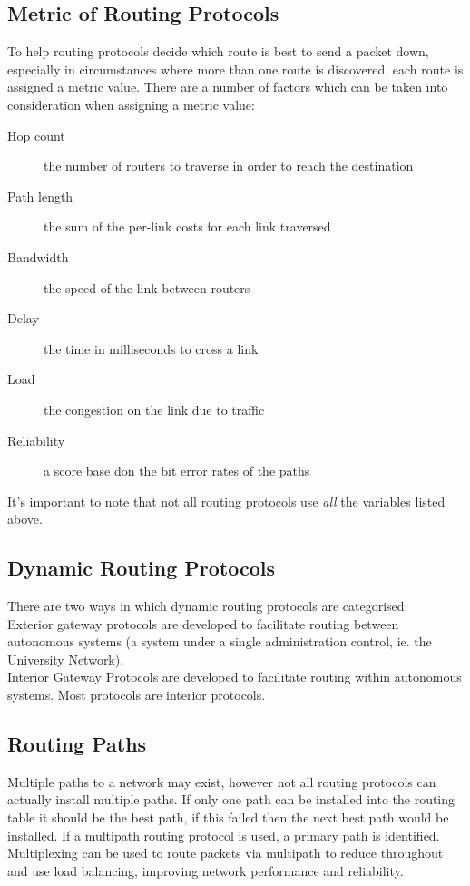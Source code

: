 \subsection{Metric of Routing Protocols}
To help routing protocols decide which route is best to send a packet down, especially in circumstances where more than one route is discovered, each route is assigned a metric value. There are a number of factors which can be taken into consideration when assigning a metric value:
\begin{description}
    \item[Hop count] the number of routers to traverse in order to reach the destination
    \item[Path length] the sum of the per-link costs for each link traversed
    \item[Bandwidth] the speed of the link between routers
    \item[Delay] the time in milliseconds to cross a link
    \item[Load] the congestion on the link due to traffic
    \item[Reliability] a score base don the bit error rates of the paths
\end{description}

It's important to note that not all routing protocols use \textit{all} the variables listed above. 

\subsection{Dynamic Routing Protocols}
There are two ways in which dynamic routing protocols are categorised.\\

Exterior gateway protocols are developed to facilitate routing between autonomous systems (a system under a single administration control, ie. the University Network).\\

Interior Gateway Protocols are developed to facilitate routing within autonomous systems. Most protocols are interior protocols.

\subsection{Routing Paths}
Multiple paths to a network may exist, however not all routing protocols can actually install multiple paths. If only one path can be installed into the routing table it should be the best path, if this failed then the next best path would be installed. If a multipath routing protocol is used, a primary path is identified. Multiplexing can be used to route packets via multipath to reduce throughout and use load balancing, improving network performance and reliability.

